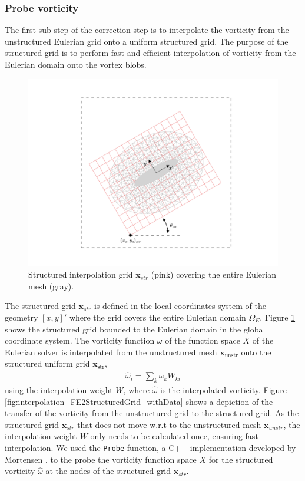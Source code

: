 \subsubsection*{Probe vorticity}

The first sub-step of the correction step is to interpolate the vorticity from the unstructured Eulerian grid onto a uniform structured grid. The purpose of the structured grid is to perform fast and efficient interpolation of vorticity from the Eulerian domain onto the vortex blobs. 

	\begin{figure}[h]
	\centering
	\includegraphics[trim=4.37cm 1.58cm 3.86cm 1.58cm, clip, width=0.5\linewidth]{./figures/hybrid/interpolation/ellipse/interpolation_FE2andStructuredGrid.pdf}
	\caption{Structured interpolation grid $\mathbf{x}_{str}$ (pink) covering the entire Eulerian mesh (gray).}
	\label{fig:interpolation_FE2andStructuredGrid}
	\end{figure}	
	
The structured grid $\mathbf{x}_{str}$ is defined in the local coordinates system of the geometry $[x,y]'$ where the grid covers the entire Eulerian domain $\Omega_E$. Figure \ref{fig:interpolation_FE2andStructuredGrid} shows the structured grid bounded to the Eulerian domain in the global coordinate system. The vorticity function $\omega$ of the function space $X$ of the Eulerian solver is interpolated from the unstructured mesh $\mathbf{x}_{\mathrm{unstr}}$ onto the structured uniform grid $\mathbf{x}_{\mathrm{str}}$,
	\begin{eqnarray}
	\hat{\omega}_i = \sum_k \omega_k W_{ki}
	\end{eqnarray}
using the interpolation weight $W$, where $\hat{\omega}$ is the interpolated vorticity. Figure \ref{fig:interpolation_FE2StructuredGrid_withData} shows a depiction of the transfer of the vorticity from the unstructured grid to the structured grid. As the structured grid $\mathbf{x}_{str}$ that does not move w.r.t to the unstructured mesh $\mathbf{x}_{unstr}$, the interpolation weight $W$ only needs to be calculated once, ensuring fast interpolation. We used the \texttt{Probe} function, a C++ implementation developed by Mortensen \cite{fenicstools}, to the probe the vorticity function space $X$ for the structured vorticity $\hat{\omega}$ at the nodes of the structured grid $\mathbf{x}_{str}$.

